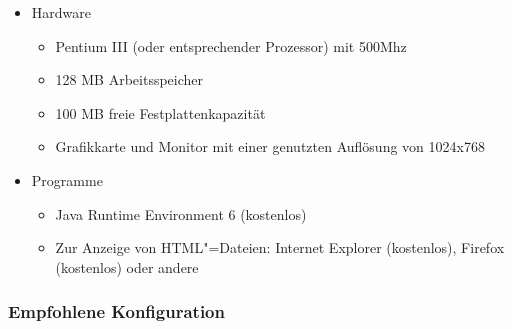 \documentclass[11pt,a4paper,twoside,ngerman]{article}
\begin{document}
\begin{itemize}

\item Hardware
\begin{itemize}

\item Pentium III (oder entsprechender Prozessor) mit 500Mhz


\item 128 MB Arbeitsspeicher


\item 100 MB freie Festplattenkapazität


\item Grafikkarte und Monitor mit einer genutzten Auflösung von 1024x768


\end{itemize}



\item Programme
\begin{itemize}

\item Java Runtime Environment 6 (kostenlos)


\item Zur Anzeige von HTML"=Dateien: Internet Explorer (kostenlos), Firefox (kostenlos) oder andere


\end{itemize}



\end{itemize}

\subsubsection*{Empfohlene Konfiguration}
\end{document}
